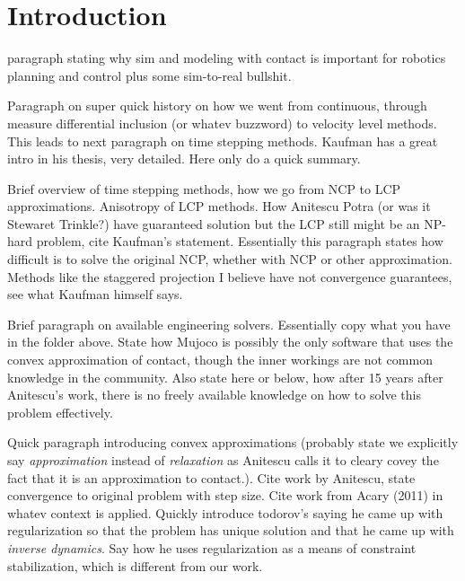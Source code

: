 % 
% 
% 

\section{Introduction}
\label{sec:introduction}

 paragraph stating why sim and modeling with contact is
important for robotics planning and control plus some sim-to-real bullshit.

Paragraph on super quick history on how we went from continuous, through measure
differential inclusion (or whatev buzzword) to velocity level methods. This
leads to next paragraph on time stepping methods. Kaufman has a great intro in his thesis, very detailed. Here only do a quick summary.

Brief overview of time stepping methods, how we go from NCP to LCP
approximations. Anisotropy of LCP methods. How Anitescu Potra (or was it
Stewaret Trinkle?) have guaranteed solution but the LCP still might be an
NP-hard problem, cite Kaufman's statement. Essentially this paragraph states how
difficult is to solve the original NCP, whether with NCP or other approximation.
Methods like the staggered projection I believe have not convergence guarantees,
see what Kaufman himself says.

Brief paragraph on available engineering solvers. Essentially copy what you have
in the folder above. State how Mujoco is possibly the only software that uses the convex approximation of contact, though the inner workings are not common knowledge in the community. Also state here or below, how after 15 years after Anitescu's work, there is no freely available knowledge on how to solve this problem effectively.

Quick paragraph introducing convex approximations (probably state we explicitly
say \emph{approximation} instead of \emph{relaxation} as Anitescu calls it to
cleary covey the fact that it is an approximation to contact.). Cite work by
Anitescu, state convergence to original problem with step size. Cite work from
Acary (2011) in whatev context is applied. Quickly introduce todorov's saying he
came up with regularization so that the problem has unique solution and that he
came up with \emph{inverse dynamics}. Say how he uses regularization as a means
of constraint stabilization, which is different from our work.

